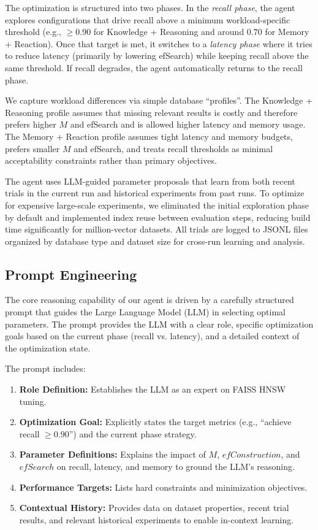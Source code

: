 \documentclass{article}
\begin{document}
The optimization is structured into two phases. In the \emph{recall phase}, the agent explores
configurations that drive recall above a minimum workload-specific threshold (e.g., $\geq 0.90$ for
Knowledge + Reasoning and around $0.70$ for Memory + Reaction). Once that target is met, it switches
to a \emph{latency phase} where it tries to reduce latency (primarily by lowering efSearch) while
keeping recall above the same threshold. If recall degrades, the agent automatically returns to
the recall phase.

We capture workload differences via simple database ``profiles''. The Knowledge + Reasoning profile
assumes that missing relevant results is costly and therefore prefers higher $M$ and efSearch and
is allowed higher latency and memory usage. The Memory + Reaction profile assumes tight latency and
memory budgets, prefers smaller $M$ and efSearch, and treats recall thresholds as minimal
acceptability constraints rather than primary objectives. 

The agent uses LLM-guided parameter proposals that learn from both recent trials in the current run
and historical experiments from past runs. To optimize for expensive
large-scale experiments, we eliminated the initial exploration phase by default and implemented index
reuse between evaluation steps, reducing build time significantly for million-vector datasets.
All trials are logged to JSONL files organized by database type and dataset size for cross-run
learning and analysis.

\subsection{Prompt Engineering}

The core reasoning capability of our agent is driven by a carefully structured prompt that guides the Large Language Model (LLM) in selecting optimal parameters. The prompt provides the LLM with a clear role, specific optimization goals based on the current phase (recall vs. latency), and a detailed context of the optimization state.

The prompt includes:
\begin{enumerate}
    \item \textbf{Role Definition:} Establishes the LLM as an expert on FAISS HNSW tuning.
    \item \textbf{Optimization Goal:} Explicitly states the target metrics (e.g., ``achieve recall $\geq 0.90$'') and the current phase strategy.
    \item \textbf{Parameter Definitions:} Explains the impact of $M$, $efConstruction$, and $efSearch$ on recall, latency, and memory to ground the LLM's reasoning.
    \item \textbf{Performance Targets:} Lists hard constraints and minimization objectives.
    \item \textbf{Contextual History:} Provides data on dataset properties, recent trial results, and relevant historical experiments to enable in-context learning.
\end{enumerate}
\end{document}
